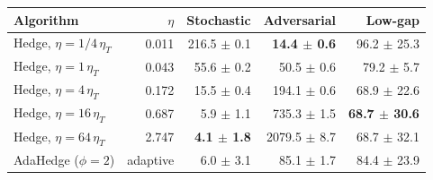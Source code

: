 \begin{tabular}{l r r r r}
\toprule
Algorithm & $\eta$ & Stochastic & Adversarial & Low-gap \\
\midrule
Hedge, $\eta=1/4\,\eta_T$ & 0.011 & 216.5 $\pm$ 0.1 & \textbf{14.4 $\pm$ 0.6} & 96.2 $\pm$ 25.3 \\
Hedge, $\eta=1\,\eta_T$ & 0.043 & 55.6 $\pm$ 0.2 & 50.5 $\pm$ 0.6 & 79.2 $\pm$ 5.7 \\
Hedge, $\eta=4\,\eta_T$ & 0.172 & 15.5 $\pm$ 0.4 & 194.1 $\pm$ 0.6 & 68.9 $\pm$ 22.6 \\
Hedge, $\eta=16\,\eta_T$ & 0.687 & 5.9 $\pm$ 1.1 & 735.3 $\pm$ 1.5 & \textbf{68.7 $\pm$ 30.6} \\
Hedge, $\eta=64\,\eta_T$ & 2.747 & \textbf{4.1 $\pm$ 1.8} & 2079.5 $\pm$ 8.7 & 68.7 $\pm$ 32.1 \\
\midrule
AdaHedge ($\phi=2$) & adaptive & 6.0 $\pm$ 3.1 & 85.1 $\pm$ 1.7 & 84.4 $\pm$ 23.9 \\
\bottomrule
\end{tabular}
